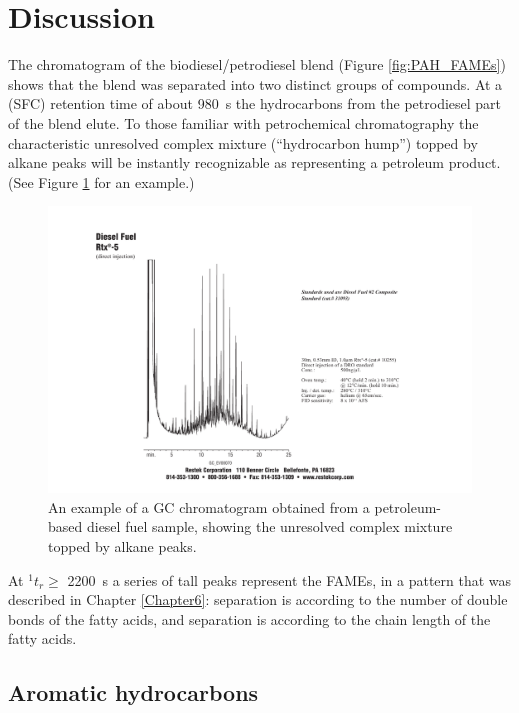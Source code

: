 \section{Discussion}


The chromatogram of the biodiesel/petrodiesel blend (Figure \ref{fig:PAH_FAMEs}) shows
that the blend was separated into two distinct groups of compounds. At a \oneD
(SFC) retention time of about \SI{980}{\second} the hydrocarbons from the
petrodiesel part of the blend elute. To those familiar with petrochemical
chromatography the characteristic unresolved complex mixture (``hydrocarbon
hump'') topped by alkane peaks will be instantly recognizable as representing
a petroleum product. (See Figure \ref{fig:HCHump} for an example.)

\begin{figure}
	\centering
	\includegraphics[width=\textwidth]{Figures/hchump.pdf}
	\decoRule	
	
\caption[An example of a petrochemical fuel chromatogram.]{An example of a GC
chromatogram obtained from a petroleum-based diesel fuel sample, showing the
unresolved complex mixture topped by alkane peaks.}
	
	\label{fig:HCHump} 
\end{figure}

At \(^{1}t_{r} \geq \) \SI{2200}{\second} a series of tall peaks represent the
FAMEs, in a pattern that was described in Chapter \ref{Chapter6}: \oneD
separation is according to the number of double bonds of the fatty acids, and
\twoD separation is according to the chain length of the fatty acids.


\subsection{Aromatic hydrocarbons}

